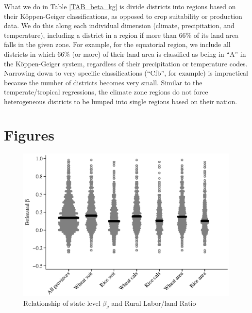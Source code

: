 \documentclass[11pt]{article}
\begin{document}
What we do in Table \ref{TAB_beta_kg} is divide districts into regions based on their K{\"o}ppen-Geiger classifications, as opposed to crop suitability or production data. We do this along each individual dimension (climate, precipitation, and temperature), including a district in a region if more than 66\% of its land area falls in the given zone. For example, for the equatorial region, we include all districts in which 66\% (or more) of their land area is classified as being in ``A'' in the K{\"o}ppen-Geiger system, regardless of their precipitation or temperature codes. Narrowing down to very specific classifications (``Cfb'', for example) is impractical because the number of districts becomes very small. Similar to the temperate/tropical regressions, the climate zone regions do not force heterogeneous districts to be lumped into single regions based on their nation. 

\section{Figures}
\begin{figure}[!htb]
\begin{center}
\caption{Relationship of state-level $\beta_g$ and Rural Labor/land Ratio}
\label{FIG_beta_state}
\includegraphics[width=1.0\textwidth]{fig_beta_province.eps}
\end{center}
\vspace{-.5cm}
\end{figure}
\clearpage
\end{document}
